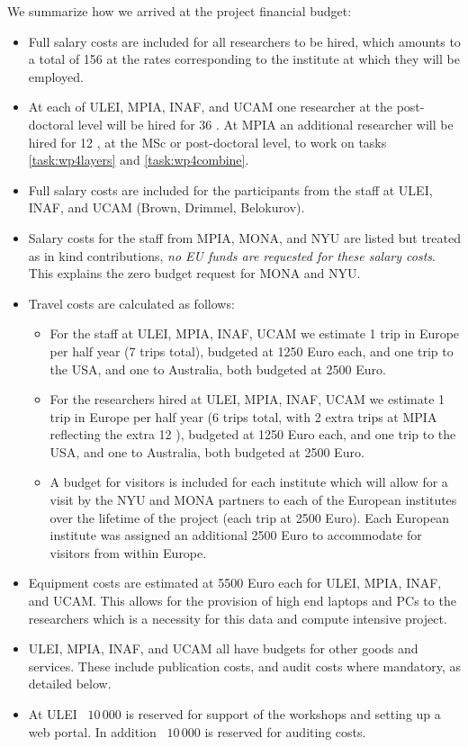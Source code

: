 We summarize how we arrived at the project financial budget:
\begin{itemize}
    \item Full salary costs are included for all researchers to be hired, which amounts to a total of 156 {\pems} at the rates corresponding to the institute at which they will be employed.
    \item At each of ULEI, MPIA, INAF, and UCAM one researcher at the post-doctoral level will be hired for 36 {\pems}. At MPIA an additional researcher will be hired for 12 {\pems}, at the MSc or post-doctoral level, to work on tasks \ref{task:wp4layers} and \ref{task:wp4combine}.
    \item Full salary costs are included for the participants from the staff at ULEI, INAF, and UCAM (Brown, Drimmel, Belokurov).
    \item Salary costs for the staff from MPIA, MONA, and NYU are listed but treated as in kind contributions, \emph{no EU funds are requested for these salary costs}. This explains the zero budget request for MONA and NYU.
    \item Travel costs are calculated as follows:
    \begin{itemize}
        \item For the staff at ULEI, MPIA, INAF, UCAM we estimate 1 trip in Europe per half year (7 trips total), budgeted at 1250 Euro each, and one trip to the USA, and one to Australia, both budgeted at 2500 Euro.
        \item For the researchers hired at ULEI, MPIA, INAF, UCAM we estimate 1 trip in Europe per half year (6 trips total, with 2 extra trips at MPIA reflecting the extra 12 \pems), budgeted at 1250 Euro each, and one trip to the USA, and one to Australia, both budgeted at 2500 Euro.
        \item A budget for visitors is included for each institute which will allow for a visit by the NYU and MONA partners to each of the European institutes over the lifetime of the project (each trip at 2500 Euro). Each European institute was assigned an additional 2500 Euro to accommodate for visitors from within Europe.
    \end{itemize}
    \item Equipment costs are estimated at 5500 Euro each for ULEI, MPIA, INAF, and UCAM. This allows for the provision of high end laptops and PCs to the researchers which is a necessity for this data and compute intensive project.
    \item ULEI, MPIA, INAF, and UCAM all have budgets for other goods and services. These include publication costs, and audit costs where mandatory, as detailed below.
    \item At ULEI \EUR\ $10\,000$ is reserved for support of the workshops and setting up a web portal. In addition \EUR\ $10\,000$ is reserved for auditing costs.
\end{itemize}

